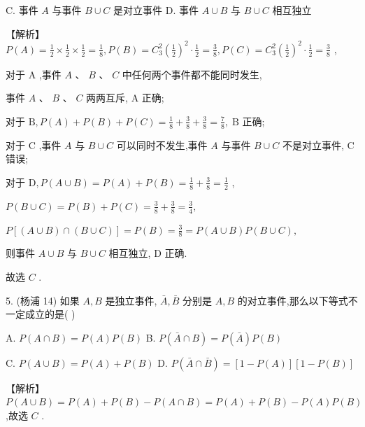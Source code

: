 \documentclass[10pt]{article}
\begin{document}
C. 事件 \(A\) 与事件 \(B \cup  C\) 是对立事件 D. 事件 \(A \cup  B\) 与 \(B \cup  C\) 相互独立

【解析】 \(P\left( A\right)  = \frac{1}{2} \times  \frac{1}{2} \times  \frac{1}{2} = \frac{1}{8},P\left( B\right)  = {C}_{3}^{2}{\left( \frac{1}{2}\right) }^{2} \cdot  \frac{1}{2} = \frac{3}{8},P\left( C\right)  = {C}_{3}^{2}{\left( \frac{1}{2}\right) }^{2} \cdot  \frac{1}{2} = \frac{3}{8}\) ,

对于 \(\mathrm{A}\) ,事件 \(A\text{ 、 }B\text{ 、 }C\) 中任何两个事件都不能同时发生,

事件 \(A\text{ 、 }B\text{ 、 }C\) 两两互斥, \(\mathrm{A}\) 正确;

对于 \(\mathrm{B},P\left( A\right)  + P\left( B\right)  + P\left( C\right)  = \frac{1}{8} + \frac{3}{8} + \frac{3}{8} = \frac{7}{8},\mathrm{\;B}\) 正确;

对于 \(\mathrm{C}\) ,事件 \(A\) 与 \(B \cup  C\) 可以同时不发生,事件 \(A\) 与事件 \(B \cup  C\) 不是对立事件, C 错误;

对于 \(\mathrm{D},P\left( {A \cup  B}\right)  = P\left( A\right)  + P\left( B\right)  = \frac{1}{8} + \frac{3}{8} = \frac{1}{2}\) ,

\(P\left( {B \cup  C}\right)  = P\left( B\right)  + P\left( C\right)  = \frac{3}{8} + \frac{3}{8} = \frac{3}{4},\)

\(P\left\lbrack  {\left( {A \cup  B}\right)  \cap  \left( {B \cup  C}\right) }\right\rbrack   = P\left( B\right)  = \frac{3}{8} = P\left( {A \cup  B}\right) P\left( {B \cup  C}\right) ,\)

则事件 \(A \cup  B\) 与 \(B \cup  C\) 相互独立, \(\mathrm{D}\) 正确.

故选 \(C\) .

5. (杨浦 14) 如果 \(A,B\) 是独立事件, \(\bar{A},\bar{B}\) 分别是 \(A,B\) 的对立事件,那么以下等式不一定成立的是( )

A. \(P\left( {A \cap  B}\right)  = P\left( A\right) P\left( B\right)\) B. \(P\left( {\bar{A} \cap  B}\right)  = P\left( \bar{A}\right) P\left( B\right)\)

C. \(P\left( {A \cup  B}\right)  = P\left( A\right)  + P\left( B\right)\) D. \(P\left( {\bar{A} \cap  \bar{B}}\right)  = \left\lbrack  {1 - P\left( A\right) }\right\rbrack  \left\lbrack  {1 - P\left( B\right) }\right\rbrack\)

【解析】 \(P\left( {A \cup  B}\right)  = P\left( A\right)  + P\left( B\right)  - P\left( {A \cap  B}\right)  = P\left( A\right)  + P\left( B\right)  - P\left( A\right) P\left( B\right)\) ,故选 \(C\) .
\end{document}
